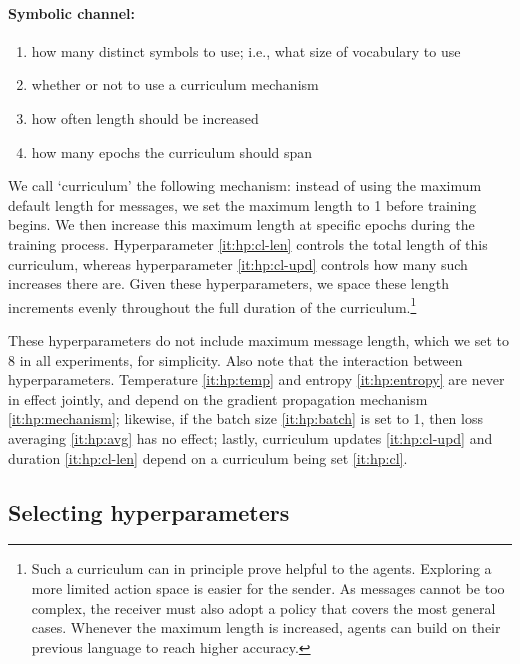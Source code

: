\documentclass[twocolumn]{article}
\begin{document}
\paragraph{Symbolic channel:}
\begin{enumerate}[resume*]
    \vspace*{-0.5em}
    \itemsep-0.25em 
    \item how many distinct symbols to use; i.e., what size of vocabulary to use
    \item \label{it:hp:cl} whether or not to use a curriculum mechanism
    \item \label{it:hp:cl-upd} how often length should be increased
    \item \label{it:hp:cl-len} how many epochs the curriculum should span
\end{enumerate}

We call `curriculum' the following mechanism: instead of using the maximum default length for messages, we set the maximum length to 1 before training begins.
We then increase this maximum length at specific epochs during the training process.
Hyperparameter \ref{it:hp:cl-len} controls the total length of this curriculum, whereas hyperparameter \ref{it:hp:cl-upd} controls how many such increases there are.
Given these hyperparameters, we space these length increments evenly throughout the full duration of the curriculum.\footnote{
    Such a curriculum can in principle prove helpful to the agents.
    Exploring a more limited action space is easier for the sender.
    As messages cannot be too complex, the receiver must also adopt a policy that covers the most general cases.
    Whenever the maximum length is increased, agents can build on their previous language to reach higher accuracy.
}

These hyperparameters do not include maximum message length, which we set to 8 in all experiments, for simplicity.
Also note that the interaction between hyperparameters.
Temperature \ref{it:hp:temp} and entropy \ref{it:hp:entropy} are never in effect jointly, and depend on the gradient propagation mechanism \ref{it:hp:mechanism}; likewise, if the batch size \ref{it:hp:batch} is set to 1, then loss averaging \ref{it:hp:avg} has no effect; lastly, curriculum updates \ref{it:hp:cl-upd} and duration \ref{it:hp:cl-len} depend on a curriculum being set \ref{it:hp:cl}.

\subsection{Selecting hyperparameters} \label{sec:experiment:bayes-opt}
\end{document}
